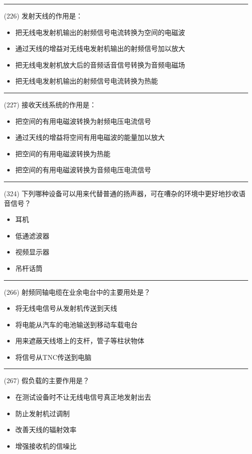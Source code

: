 \documentclass[twocolumn,hyperref,UTF8]{ctexart}  %
\begin{document}
\noindent\rule{0.5\textwidth}{1pt}
\heiti (226) 发射天线的作用是： \songti {\color{gray} [LK0420] }
\begin{itemize}
	\item  把无线电发射机输出的射频信号电流转换为空间的电磁波
	\item  通过天线的增益对无线电发射机输出的射频信号加以放大
	\item  把无线电发射机放大后的音频话音信号转换为音频电磁场
	\item  把无线电发射机输出的射频信号电流转换为热能
\end{itemize}


\noindent\rule{0.5\textwidth}{1pt}
\heiti (227) 接收天线系统的作用是： \songti {\color{gray} [LK0421] }
\begin{itemize}
	\item  把空间的有用电磁波转换为射频电压电流信号
	\item  通过天线的增益将空间有用电磁波的能量加以放大
	\item  把空间的有用电磁波转换为热能
	\item  把空间的有用电磁波转换为音频电压电流信号
\end{itemize}


\noindent\rule{0.5\textwidth}{1pt}
\heiti (324) 下列哪种设备可以用来代替普通的扬声器，可在嘈杂的环境中更好地抄收语音信号？ \songti {\color{gray} [LK1122] }
\begin{itemize}
	\item  耳机
	\item  低通滤波器
	\item  视频显示器
	\item  吊杆话筒
\end{itemize}


\noindent\rule{0.5\textwidth}{1pt}
\heiti (266) 射频同轴电缆在业余电台中的主要用处是？ \songti {\color{gray} [LK1173] }
\begin{itemize}
	\item  将无线电信号从发射机传送到天线
	\item  将电能从汽车的电池输送到移动车载电台
	\item  用来遮蔽天线塔上的支杆，管子等柱状物体
	\item  将信号从TNC传送到电脑
\end{itemize}


\noindent\rule{0.5\textwidth}{1pt}
\heiti (267) 假负载的主要作用是？ \songti {\color{gray} [LK1183] }
\begin{itemize}
	\item  在测试设备时不让无线电信号真正地发射出去
	\item  防止发射机过调制
	\item  改善天线的辐射效率
	\item  增强接收机的信噪比
\end{itemize}
\end{document}

